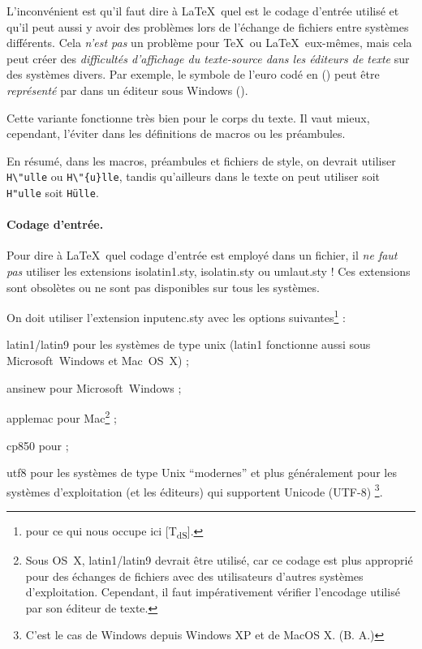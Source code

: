 \documentclass[fontsize=11pt, paper=a4, pagesize, captions=tableheading, numbers=enddot, toc=graduated, footnotes=multiple]{scrartcl}%
\newcommand{\Paket}[1]{\textsf{#1.sty}\xspace}
\newcommand{\Option}[1]{\textsf{#1}\xspace}
\newenvironment{description*}{%
  \description%
    \setlength{\itemsep}{0pt}}%
  {\enddescription}
\newcommand{\NDT}{[T\textsubscript{dS}].} %
\begin{document}
\begin{enumerate}[wide]
  L’inconvénient est qu’il faut dire à \LaTeX\ quel est le codage d'entrée utilisé et qu’il peut aussi y avoir des problèmes lors de l'échange de fichiers entre systèmes différents. Cela \emph{n'est pas} un problème pour \TeX\ ou \LaTeX\ eux-mêmes, mais cela peut créer des \emph{difficultés d'affichage du texte-source dans les éditeurs de texte} sur des systèmes divers. Par exemple, le symbole de l'euro codé en  () peut être \emph{représenté} par {\selectfont\textcurrency}{} dans un éditeur sous Windows ().

  Cette variante fonctionne très bien pour le corps du texte. Il vaut mieux, cependant, l'éviter dans les définitions de macros ou les préambules.
\end{enumerate}
%
En résumé, dans les macros, préambules et fichiers de style, on devrait utiliser \verb+H\"ulle+ ou \verb+H\"{u}lle+, tandis qu'ailleurs dans le texte on peut utiliser soit \verb+H"ulle+ soit \verb+Hülle+.

\paragraph{Codage d'entrée.}
\label{sec:eingabekodierung-1}

Pour dire à \LaTeX\ quel codage d'entrée est employé dans un fichier, il \emph{ne faut pas} utiliser les extensions \Paket{isolatin1}, \Paket{isolatin} ou \Paket{umlaut} ! Ces extensions sont obsolètes ou ne sont pas disponibles sur tous les systèmes.

On doit utiliser l'extension \Paket{inputenc} avec les options suivantes\footnote{pour ce qui nous occupe ici \NDT} :

\begin{description*}
\item[\Option{latin1/latin9}] pour les systèmes de type unix (\Option{latin1} fonctionne aussi sous Microsoft~Windows et Mac~OS~X) ;

\item[\Option{ansinew}] pour Microsoft~Windows ;

\item[\Option{applemac}] pour Mac\footnote{Sous OS~X, \Option{latin1/latin9} devrait être utilisé, car ce codage est plus approprié pour des échanges de fichiers avec des utilisateurs d’autres systèmes d’exploitation. Cependant, il faut impérativement vérifier l’encodage utilisé par son éditeur de texte.} ;
\item[\Option{cp850}] pour  ;

\item[\Option{utf8}] pour les systèmes de type Unix \enquote{modernes} et plus généralement pour les systèmes d’exploitation (et les éditeurs) qui supportent Unicode (UTF-8) \footnote{C’est le cas de Windows depuis Windows XP et de MacOS X. (B. A.)}.
\end{description*}
\end{document}
